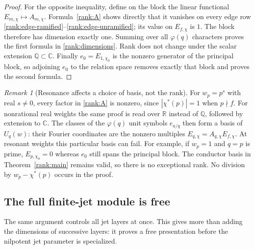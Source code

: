 \documentclass[11pt,a4paper]{article}
\theoremstyle{definition}
\theoremstyle{remark}
\newtheorem{remark}[theorem]{Remark}
\numberwithin{equation}{section}
\begin{document}
\begin{proof}
For the opposite inequality, define on the block the linear functional
$E_{m,\chi}\mapsto A_{m,\chi}$.  Formula~\eqref{rank:A} shows directly
that it vanishes on every edge row
\eqref{rank:edge-ramified}--\eqref{rank:edge-unramified}; its value on
$E_{f,\chi}$ is $1$.  The block therefore has dimension exactly one.
Summing over all $\varphi(q)$ characters proves the first formula in
\eqref{rank:dimensions}.  Rank does not change under the scalar extension
$\mathbb Q\subset\mathbb C$.  Finally $e_0=E_{1,\chi_0}$ is the nonzero
generator of the principal block, so adjoining $e_0$ to the relation
space removes exactly that block and proves the second formula.
\end{proof}

\begin{remark}[Resonance affects a choice of basis, not the rank]
\label{rank:resonance}
For $w_p=p^s$ with real $s\ne0$, every factor in
\eqref{rank:A} is nonzero, since $|\chi^*(p)|=1$ when $p\nmid f$.
For nonrational real weights the same proof is read over $\mathbb R$
instead of $\mathbb Q$, followed by extension to $\mathbb C$.
The classes of the $\varphi(q)$ unit symbols $e_{a/q}$ then form a basis
of $U_q(w)$: their Fourier coordinates are the nonzero multiples
$E_{q,\chi}=A_{q,\chi}E_{f,\chi}$.  At resonant weights this particular
basis can fail.  For example, if $w_p=1$ and $q=p$ is prime,
$E_{p,\chi_0}=0$ whereas $e_0$ still spans the principal block.
The conductor basis in Theorem~\ref{rank:main} remains valid, so there
is no exceptional rank.  No division by $w_p-\chi^*(p)$ occurs in the
proof.
\end{remark}

\subsection{The full finite-jet module is free}

The same argument controls all jet layers at once.  This gives more than
adding the dimensions of successive layers: it proves a free presentation
before the nilpotent jet parameter is specialized.
\end{document}
